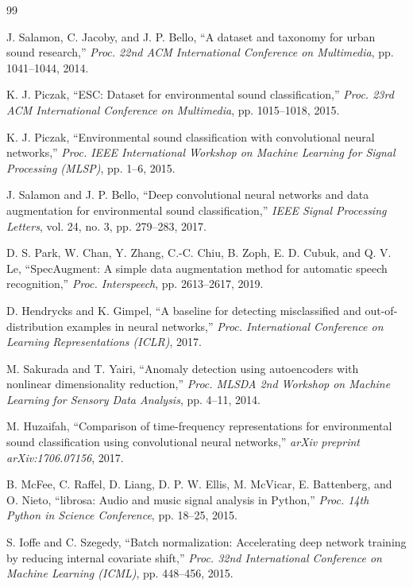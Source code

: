 \documentclass[11pt, a4paper]{article}
\begin{document}
\begin{thebibliography}{99}

J. Salamon, C. Jacoby, and J. P. Bello, ``A dataset and taxonomy for urban sound research,'' \emph{Proc. 22nd ACM International Conference on Multimedia}, pp. 1041--1044, 2014.

K. J. Piczak, ``ESC: Dataset for environmental sound classification,'' \emph{Proc. 23rd ACM International Conference on Multimedia}, pp. 1015--1018, 2015.

K. J. Piczak, ``Environmental sound classification with convolutional neural networks,'' \emph{Proc. IEEE International Workshop on Machine Learning for Signal Processing (MLSP)}, pp. 1--6, 2015.

J. Salamon and J. P. Bello, ``Deep convolutional neural networks and data augmentation for environmental sound classification,'' \emph{IEEE Signal Processing Letters}, vol. 24, no. 3, pp. 279--283, 2017.

D. S. Park, W. Chan, Y. Zhang, C.-C. Chiu, B. Zoph, E. D. Cubuk, and Q. V. Le, ``SpecAugment: A simple data augmentation method for automatic speech recognition,'' \emph{Proc. Interspeech}, pp. 2613--2617, 2019.

D. Hendrycks and K. Gimpel, ``A baseline for detecting misclassified and out-of-distribution examples in neural networks,'' \emph{Proc. International Conference on Learning Representations (ICLR)}, 2017.

M. Sakurada and T. Yairi, ``Anomaly detection using autoencoders with nonlinear dimensionality reduction,'' \emph{Proc. MLSDA 2nd Workshop on Machine Learning for Sensory Data Analysis}, pp. 4--11, 2014.

M. Huzaifah, ``Comparison of time-frequency representations for environmental sound classification using convolutional neural networks,'' \emph{arXiv preprint arXiv:1706.07156}, 2017.

B. McFee, C. Raffel, D. Liang, D. P. W. Ellis, M. McVicar, E. Battenberg, and O. Nieto, ``librosa: Audio and music signal analysis in Python,'' \emph{Proc. 14th Python in Science Conference}, pp. 18--25, 2015.

S. Ioffe and C. Szegedy, ``Batch normalization: Accelerating deep network training by reducing internal covariate shift,'' \emph{Proc. 32nd International Conference on Machine Learning (ICML)}, pp. 448--456, 2015.


\end{thebibliography}
\end{document}

